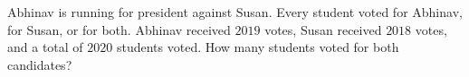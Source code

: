 Abhinav is running for president against Susan. Every student voted for Abhinav, for Susan, or for both. Abhinav received $2019$ votes, Susan received $2018$ votes, and a total of $2020$ students voted. How many students voted for both candidates?

